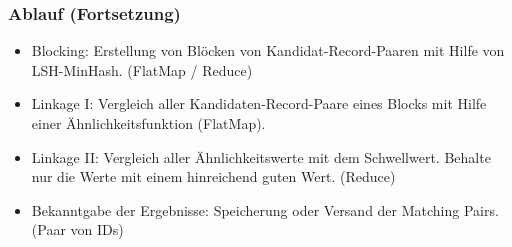 \documentclass{beamer}
\begin{document}
    \begin{frame}
    		\frametitle{Ablauf (Fortsetzung)}
    
    		\begin{itemize}
        		\item Blocking: Erstellung von Blöcken von Kandidat-Record-Paaren mit Hilfe von
        		 LSH-MinHash. (FlatMap / Reduce)
			\item Linkage I: Vergleich aller Kandidaten-Record-Paare eines Blocks mit Hilfe einer
			 Ähnlichkeitsfunktion (FlatMap).
			\item Linkage II: Vergleich aller Ähnlichkeitswerte mit dem Schwellwert. Behalte nur
			 die Werte mit einem hinreichend guten Wert. (Reduce)
			\item Bekanntgabe der Ergebnisse: Speicherung oder Versand der Matching Pairs.
			 (Paar von IDs)
		\end{itemize}
    \end{frame}
\end{document}
